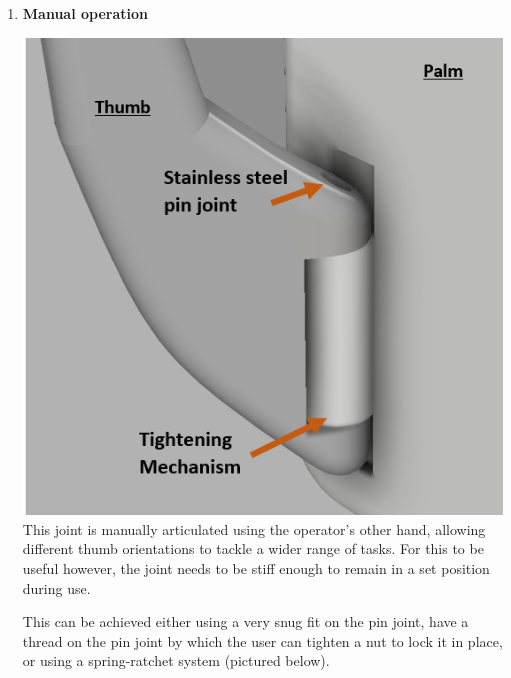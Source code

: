 \documentclass[11pt,3p]{report}
\begin{document}
\begin{multicols}{2}
\begin{enumerate}[noitemsep]
			\item \textbf{Manual operation} {
				
				\includegraphics[scale=0.48]{man_thumb.PNG}
				This joint is manually articulated using the operator's other hand, allowing different thumb orientations to tackle a wider range of tasks. For this to be useful however, the joint needs to be stiff enough to remain in a set position during use. 
				
				This can be achieved either using a very snug fit on the pin joint, have a thread on the pin joint by which the user can tighten a nut to lock it in place, or using a spring-ratchet system (pictured below). 
				
}
\end{enumerate}
\end{multicols}
\end{document}
